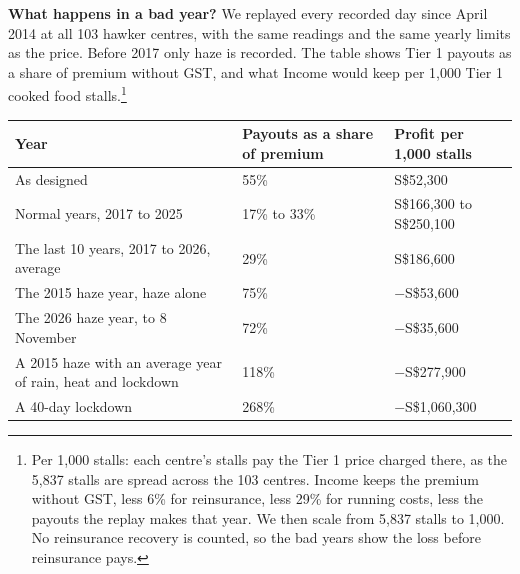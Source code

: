 \documentclass[11pt,a4paper]{article}
\newcommand{\head}{\rowcolor{soft}}
\newcommand{\sgd}{\textup{S\$}}
\begin{document}
\textbf{What happens in a bad year?} We replayed every recorded day since April 2014 at all 103 hawker centres, with the same readings and the same yearly limits as the price.\cite{team-data} Before 2017 only haze is recorded. The table shows Tier 1 payouts as a share of premium without GST, and what Income would keep per 1,000 Tier 1 cooked food stalls.\footnote{Per 1,000 stalls: each centre's stalls pay the Tier 1 price charged there, as the 5,837 stalls are spread across the 103 centres. Income keeps the premium without GST, less 6\% for reinsurance, less 29\% for running costs, less the payouts the replay makes that year. We then scale from 5,837 stalls to 1,000. No reinsurance recovery is counted, so the bad years show the loss before reinsurance pays.}

\begin{center}
\small
\begin{tabularx}{\textwidth}{|Y|C{3.4cm}|R{4.2cm}|}
\hline
\head \textbf{Year} & \textbf{Payouts as a share of premium} & \textbf{Profit per 1,000 stalls} \\
\hline
As designed & 55\% & \sgd 52,300 \\
\hline
Normal years, 2017 to 2025 & 17\% to 33\% & \sgd 166,300 to \sgd 250,100 \\
\hline
The last 10 years, 2017 to 2026, average & 29\% & \sgd 186,600 \\
\hline
{}The 2015 haze year, haze alone & 75\% & $-$\sgd 53,600 \\
\hline
{}The 2026 haze year, to 8 November & 72\% & $-$\sgd 35,600 \\
\hline
{}A 2015 haze with an average year of rain, heat and lockdown & 118\% & $-$\sgd 277,900 \\
\hline
{}A 40-day lockdown & 268\% & $-$\sgd 1,060,300 \\
\hline
\end{tabularx}
\end{center}
\end{document}
